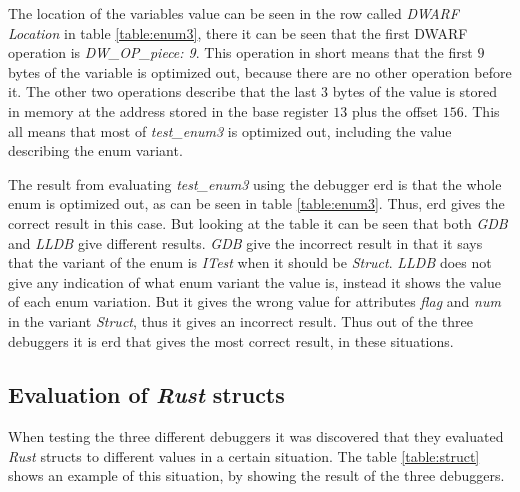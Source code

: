 The location of the variables value can be seen in the row called \emph{DWARF Location} in table \ref{table:enum3}, there it can be seen that the first \gls{DWARF} operation is \emph{DW\_OP\_piece: 9}.
This operation in short means that the first $9$ bytes of the variable is optimized out, because there are no other operation before it.
The other two operations describe that the last $3$ bytes of the value is stored in memory at the address stored in the base register $13$ plus the offset $156$.
This all means that most of \emph{test\_enum3} is optimized out, including the value describing the enum variant.


The result from evaluating \emph{test\_enum3} using the debugger \gls{erd} is that the whole enum is optimized out, as can be seen in table \ref{table:enum3}.
Thus, \gls{erd} gives the correct result in this case.
But looking at the table it can be seen that both \emph{GDB} and \emph{LLDB} give different results.
\emph{GDB} give the incorrect result in that it says that the variant of the enum is \emph{ITest} when it should be \emph{Struct}.
\emph{LLDB} does not give any indication of what enum variant the value is, instead it shows the value of each enum variation.
But it gives the wrong value for attributes \emph{flag} and \emph{num} in the variant \emph{Struct}, thus it gives an incorrect result.
Thus out of the three debuggers it is \gls{erd} that gives the most correct result, in these situations.



\subsection{Evaluation of \emph{Rust} structs}
When testing the three different debuggers it was discovered that they evaluated \emph{Rust} structs to different values in a certain situation.
The table \ref{table:struct} shows an example of this situation, by showing the result of the three debuggers.


